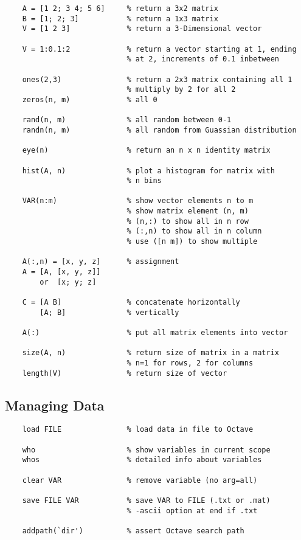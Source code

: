 \documentclass[12pt, a4paper]{article}
\begin{document}
    \begin{lstlisting}
    A = [1 2; 3 4; 5 6]     % return a 3x2 matrix
    B = [1; 2; 3]           % return a 1x3 matrix
    V = [1 2 3]             % return a 3-Dimensional vector

    V = 1:0.1:2             % return a vector starting at 1, ending
                            % at 2, increments of 0.1 inbetween

    ones(2,3)               % return a 2x3 matrix containing all 1
                            % multiply by 2 for all 2
    zeros(n, m)             % all 0

    rand(n, m)              % all random between 0-1
    randn(n, m)             % all random from Guassian distribution

    eye(n)                  % return an n x n identity matrix

    hist(A, n)              % plot a histogram for matrix with 
                            % n bins   
 
    VAR(n:m)                % show vector elements n to m
                            % show matrix element (n, m)
                            % (n,:) to show all in n row
                            % (:,n) to show all in n column
                            % use ([n m]) to show multiple
  
    A(:,n) = [x, y, z]      % assignment
    A = [A, [x, y, z]]
        or  [x; y; z]

    C = [A B]               % concatenate horizontally
        [A; B]              % vertically

    A(:)                    % put all matrix elements into vector

    size(A, n)              % return size of matrix in a matrix
                            % n=1 for rows, 2 for columns
    length(V)               % return size of vector
    \end{lstlisting}

  \subsection{Managing Data}

    \begin{lstlisting}
    load FILE               % load data in file to Octave

    who                     % show variables in current scope
    whos                    % detailed info about variables
    
    clear VAR               % remove variable (no arg=all)

    save FILE VAR           % save VAR to FILE (.txt or .mat)
                            % -ascii option at end if .txt

    addpath(`dir')          % assert Octave search path
    \end{lstlisting}
    \vspace{1em}
\end{document}
